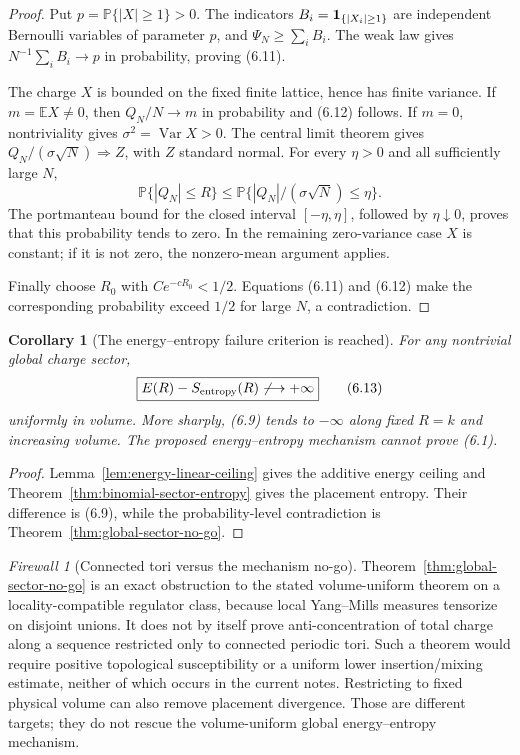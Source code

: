 \documentclass[11pt]{article}
\newtheorem{corollary}[theorem]{Corollary}
\theoremstyle{definition}
\theoremstyle{remark}
\newtheorem{firewall}[theorem]{Firewall}
\begin{document}
\begin{proof}
Put $p=\mathbb P\{|X|\ge1\}>0$.  The indicators
$B_i={\bf1}_{\{|X_i|\ge1\}}$ are independent Bernoulli variables of
parameter $p$, and $\Psi_N\ge\sum_iB_i$.  The weak law gives
$N^{-1}\sum_iB_i\to p$ in probability, proving (6.11).

The charge $X$ is bounded on the fixed finite lattice, hence has finite
variance.  If $m=\mathbb EX\ne0$, then $Q_N/N\to m$ in probability and
(6.12) follows.  If $m=0$, nontriviality gives
$\sigma^2=\operatorname{Var}X>0$.  The central limit theorem gives
$Q_N/(\sigma\sqrt N)\Rightarrow Z$, with $Z$ standard normal.  For every
$\eta>0$ and all sufficiently large $N$,
\[
 \mathbb P\{|Q_N|\le R\}
 \le\mathbb P\{|Q_N|/(\sigma\sqrt N)\le\eta\}.
\]
The portmanteau bound for the closed interval $[-\eta,\eta]$, followed by
$\eta\downarrow0$, proves that this probability tends to zero.  In the
remaining zero-variance case $X$ is constant; if it is not zero, the
nonzero-mean argument applies.

Finally choose $R_0$ with $Ce^{-cR_0}<1/2$.  Equations (6.11) and (6.12)
make the corresponding probability exceed $1/2$ for large $N$, a
contradiction.
\end{proof}

\begin{corollary}[The energy--entropy failure criterion is reached]
\label{cor:failure-stop}
For any nontrivial global charge sector,
\[
 \boxed{E(R)-S_{\rm entropy}(R)\not\longrightarrow+\infty}
                                                                  \tag{6.13}
\]
uniformly in volume.  More sharply, (6.9) tends to $-\infty$ along fixed
$R=k$ and increasing volume.  The proposed energy--entropy mechanism cannot
prove (6.1).
\end{corollary}

\begin{proof}
Lemma~\ref{lem:energy-linear-ceiling} gives the additive energy ceiling and
Theorem~\ref{thm:binomial-sector-entropy} gives the placement entropy.  Their
difference is (6.9), while the probability-level contradiction is
Theorem~\ref{thm:global-sector-no-go}.
\end{proof}

\begin{firewall}[Connected tori versus the mechanism no-go]
\label{firewall:connected-volume}
Theorem~\ref{thm:global-sector-no-go} is an exact obstruction to the stated
volume-uniform theorem on a locality-compatible regulator class, because
local Yang--Mills measures tensorize on disjoint unions.  It does not by
itself prove anti-concentration of total charge along a sequence restricted
only to connected periodic tori.  Such a theorem would require positive
topological susceptibility or a uniform lower insertion/mixing estimate,
neither of which occurs in the current notes.  Restricting to fixed physical
volume can also remove placement divergence.  Those are different targets;
they do not rescue the volume-uniform global energy--entropy mechanism.
\end{firewall}
\end{document}
